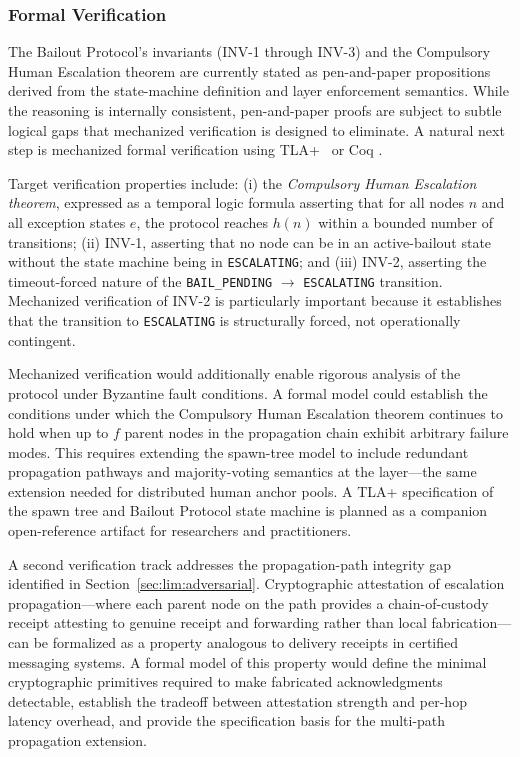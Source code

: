 \subsubsection{Formal Verification}
\label{sec:fw:verification}

The Bailout Protocol's invariants (INV-1 through INV-3) and the Compulsory Human Escalation theorem are currently stated as pen-and-paper propositions derived from the state-machine definition and \fact{} layer enforcement semantics. While the reasoning is internally consistent, pen-and-paper proofs are subject to subtle logical gaps that mechanized verification is designed to eliminate. A natural next step is mechanized formal verification using TLA+\ \cite{lamport2019tlaplus} or Coq \cite{coq2024}.

Target verification properties include: (i) the \textit{Compulsory Human Escalation theorem}, expressed as a temporal logic formula asserting that for all nodes $n$ and all exception states $e$, the protocol reaches $h(n)$ within a bounded number of transitions; (ii) INV-1, asserting that no node can be in an active-bailout state without the state machine being in \texttt{ESCALATING}; and (iii) INV-2, asserting the timeout-forced nature of the \texttt{BAIL\_PENDING} $\rightarrow$ \texttt{ESCALATING} transition. Mechanized verification of INV-2 is particularly important because it establishes that the transition to \texttt{ESCALATING} is structurally forced, not operationally contingent.

Mechanized verification would additionally enable rigorous analysis of the protocol under Byzantine fault conditions. A formal model could establish the conditions under which the Compulsory Human Escalation theorem continues to hold when up to $f$ parent nodes in the propagation chain exhibit arbitrary failure modes. This requires extending the spawn-tree model to include redundant propagation pathways and majority-voting semantics at the \fact{} layer---the same extension needed for distributed human anchor pools. A TLA+ specification of the \bxthree{} spawn tree and Bailout Protocol state machine is planned as a companion open-reference artifact for researchers and practitioners.

A second verification track addresses the propagation-path integrity gap identified in Section~\ref{sec:lim:adversarial}. Cryptographic attestation of escalation propagation---where each parent node on the path provides a chain-of-custody receipt attesting to genuine receipt and forwarding rather than local fabrication---can be formalized as a property analogous to delivery receipts in certified messaging systems. A formal model of this property would define the minimal cryptographic primitives required to make fabricated acknowledgments detectable, establish the tradeoff between attestation strength and per-hop latency overhead, and provide the specification basis for the multi-path propagation extension.

